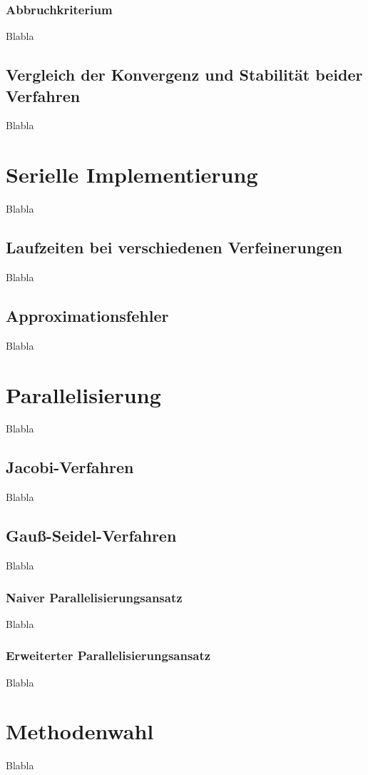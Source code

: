 \documentclass{article}
\begin{document}
\subsubsection{Abbruchkriterium}
Blabla

\subsection{Vergleich der Konvergenz und Stabilität beider Verfahren}
Blabla

\section{Serielle Implementierung}
Blabla
\subsection{Laufzeiten bei verschiedenen Verfeinerungen}
Blabla
\subsection{Approximationsfehler}
Blabla

\section{Parallelisierung}
Blabla
\subsection{Jacobi-Verfahren}
Blabla
\subsection{Gauß-Seidel-Verfahren}
Blabla
\subsubsection{Naiver Parallelisierungsansatz}
Blabla
\subsubsection{Erweiterter Parallelisierungsansatz}
Blabla

\section{Methodenwahl}
Blabla
\end{document}
